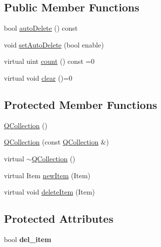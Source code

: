 \subsection*{Public Member Functions}
\begin{DoxyCompactItemize}
\item 
bool \mbox{\hyperlink{class_q_collection_a18a880ce3024c10ccf53509ba27170ac}{auto\+Delete}} () const
\item 
void \mbox{\hyperlink{class_q_collection_a6ed41913c76bfba54be6da26015ee3f3}{set\+Auto\+Delete}} (bool enable)
\item 
virtual uint \mbox{\hyperlink{class_q_collection_a6441adbfb3ffb6f55ed834c0c0bcc6cb}{count}} () const =0
\item 
virtual void \mbox{\hyperlink{class_q_collection_a92416cc22907550389aad04c26be2f77}{clear}} ()=0
\end{DoxyCompactItemize}
\subsection*{Protected Member Functions}
\begin{DoxyCompactItemize}
\item 
\mbox{\hyperlink{class_q_collection_ab66048255d5340ef60bd8f4cc32d301d}{Q\+Collection}} ()
\item 
\mbox{\hyperlink{class_q_collection_a94f0f91325b3ac2ddad20c0e74dbd629}{Q\+Collection}} (const \mbox{\hyperlink{class_q_collection}{Q\+Collection}} \&)
\item 
virtual \mbox{\hyperlink{class_q_collection_af8783f52bdb06ce53cb8a86df70af159}{$\sim$\+Q\+Collection}} ()
\item 
virtual Item \mbox{\hyperlink{class_q_collection_a8a439f0c342ff1844a797fbea15b2283}{new\+Item}} (Item)
\item 
virtual void \mbox{\hyperlink{class_q_collection_ab6c7cf56b681ba4fed6cf6a92494a410}{delete\+Item}} (Item)
\end{DoxyCompactItemize}
\subsection*{Protected Attributes}
\begin{DoxyCompactItemize}
\item 
\mbox{\label{class_q_collection_a4774837390e8009788fb1124fd051d96}} 
bool {\bfseries del\+\_\+item}
\end{DoxyCompactItemize}


